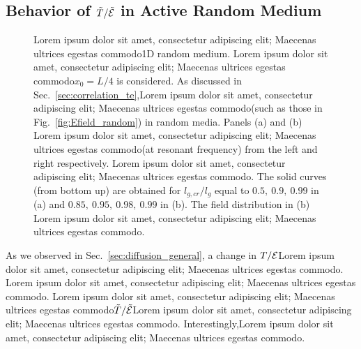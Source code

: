 \subsection{Behavior of \texorpdfstring{$\tilde{T}/\tilde{\cal E}$}{T/E} in Active Random Medium} 
\label{sec:localization_gain}

\begin{figure}
\centerline{}
\centerline{}
\caption[Lorem ipsum dolor sit amet, consectetur adipiscing elit; Maecenas ultrices egestas commodo1D random medium.]{Lorem ipsum dolor sit amet, consectetur adipiscing elit; Maecenas ultrices egestas commodo1D random medium. Lorem ipsum dolor sit amet, consectetur adipiscing elit; Maecenas ultrices egestas commodo$x_0=L/4$ is considered. As discussed in Sec.~\ref{sec:correlation_te},Lorem ipsum dolor sit amet, consectetur adipiscing elit; Maecenas ultrices egestas commodo(such as those in Fig.~\ref{fig:Efield_random}) in random media. Panels (a) and (b) Lorem ipsum dolor sit amet, consectetur adipiscing elit; Maecenas ultrices egestas commodo(at resonant frequency) from the left and right respectively. Lorem ipsum dolor sit amet, consectetur adipiscing elit; Maecenas ultrices egestas commodo. The solid curves (from bottom up) are obtained for $l_{g,cr}/l_g$ equal to $0.5,\ 0.9,\ 0.99$ in (a) and $0.85,\ 0.95,\ 0.98,\ 0.99$ in (b). The field distribution in (b) Lorem ipsum dolor sit amet, consectetur adipiscing elit; Maecenas ultrices egestas commodo.\label{fig:localization_gain}}
\end{figure}

As we observed in Sec.~\ref{sec:diffusion_general}, a change in $T/{\cal E}$Lorem ipsum dolor sit amet, consectetur adipiscing elit; Maecenas ultrices egestas commodo. Lorem ipsum dolor sit amet, consectetur adipiscing elit; Maecenas ultrices egestas commodo. Lorem ipsum dolor sit amet, consectetur adipiscing elit; Maecenas ultrices egestas commodo$\tilde{T}/\tilde{\cal E}$Lorem ipsum dolor sit amet, consectetur adipiscing elit; Maecenas ultrices egestas commodo. Interestingly,Lorem ipsum dolor sit amet, consectetur adipiscing elit; Maecenas ultrices egestas commodo. 

